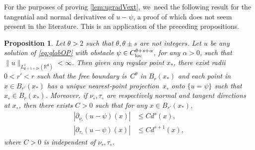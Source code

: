 \documentclass[JEP,XML,SOM,Unicode,published]{cedram}
\newcommand{\loc}{\textup{loc}}
\theoremstyle{plain}
\newtheorem{prop}[thm]{Proposition}
\theoremstyle{definition}
\newcommand{\R}{{\mathbb{R}}}
\let\p\partial
\renewcommand{\d}{\mathsf{d}}
\begin{document}
For the purposes of proving \cref{lem:ugradVext}, we~need the following result for the tangential and normal derivatives of $u-\psi$, a proof of which does not seem present in the literature. This is an application of the preceding propositions.

\begin{prop}\label{prop:OPnt}
Let $\theta>2$ such that $\theta,\theta\pm s$ are not integers. Let $u$ be any solution of \eqref{eq:globOP} with obstacle $\psi \in C_{\loc}^{\theta+s+\alpha}$, for any $\alpha>0$, such that $\|u\|_{L_{\d+1+2s}^1(\R^\d)}<\infty$. Then given any regular point $x_*$, there exist radii $0<r'<r$ such that the free boundary is~$C^{\theta}$ in $B_r(x_*)$ and each point in $x\in B_{r'}(x_*)$ has a unique nearest-point projection~$x_\circ$ onto $\{u=\psi\}$ such that $x_\circ\in B_{r}(x_*)$. Moreover, if $\nu_\circ,\tau_\circ$ are respectively normal and tangent directions at $x_\circ$, then there exists $C>0$ such that for any $x\in B_{r'}(x_*)$,
\begin{align}
|\p_{\nu_{\circ}}(u-\psi)(x)|&\le C d^s(x), \label{eq:OPntn}\\
|\p_{\tau_\circ}(u-\psi)(x)| &\le Cd^{s+1}(x), \label{eq:OPntt}
\end{align}
where $C>0$ is independent of $\nu_\circ,\tau_\circ$.
\end{prop}
\end{document}
